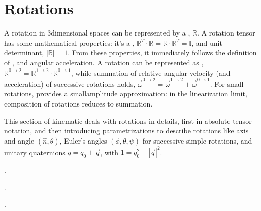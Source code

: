 \documentclass[letterpaper,10pt,english]{jupyterBook}
\begin{document}
\section{Rotations}
\label{\detokenize{ch/kinematics-rotations:rotations}}\label{\detokenize{ch/kinematics-rotations:classical-mechanics-kinematics-rotations}}\label{\detokenize{ch/kinematics-rotations::doc}}
\sphinxAtStartPar
A rotation in 3\sphinxhyphen{}dimensional spaces can be represented by a , \(\mathbb{R}\). A rotation tensor has some mathematical properties: it’s a , \(\mathbb{R}^T \cdot \mathbb{R} = \mathbb{R} \cdot \mathbb{R}^T = \mathbb{I}\), and unit determinant, \(|\mathbb{R}| = 1\).
From these properties, it immediately follows the definition of , and angular acceleration. A rotation can be represented as , \(\mathbb{R}^{0\rightarrow 2} = \mathbb{R}^{1\rightarrow 2} \cdot \mathbb{R}^{0\rightarrow 1}\), while summation of relative angular velocity (and acceleration) of successive rotations holds, \(\vec{\omega}^{0 \rightarrow 2} = \vec{\omega}^{1 \rightarrow 2} + \vec{\omega}^{0 \rightarrow 1}\). For small rotations,  provides a small\sphinxhyphen{}amplitude approximation: in the linearization limit, composition of rotations reduces to summation.

\sphinxAtStartPar
This section of kinematic deals with rotations in details, first in absolute tensor notation, and then introducing parametrizations to describe rotations like axis and angle \((\hat{n}, \theta)\), Euler’s angles \((\phi, \theta, \psi)\) for successive simple rotations, and unitary quaternions \(q = q_0 + \vec{q}\), with \(1 = q_0^2 + |\vec{q}|^2\).

\sphinxAtStartPar
{\hyperref[\detokenize{ch/kinematics-rotations-tensors:classical-mechanics-kinematics-rotations-tensor}]{}}.

\sphinxAtStartPar
{\hyperref[\detokenize{ch/kinematics-rotations-param-axis-angle:classical-mechanics-kinematics-rotations-axis-angle}]{}}.

\sphinxAtStartPar
{\hyperref[\detokenize{ch/kinematics-rotations-param-euler:classical-mechanics-kinematics-rotations-euler}]{}}.
\end{document}
